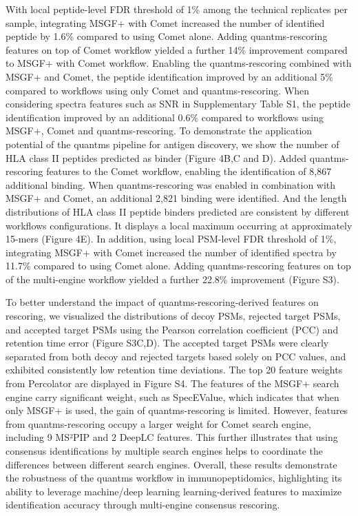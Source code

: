 \documentclass[12pt]{article}
\begin{document}
With local peptide-level FDR threshold of 1\% among the technical replicates per sample, integrating MSGF+ with Comet increased the number of identified peptide by 1.6\% compared to using Comet alone. Adding quantms-rescoring features on top of Comet workflow yielded a further 14\% improvement compared to MSGF+ with Comet workflow. Enabling the quantms-rescoring combined with MSGF+ and Comet, the peptide identification improved by an additional 5\% compared to workflows using only Comet and quantms-rescoring. When considering spectra features such as SNR in Supplementary Table S1, the peptide identification improved by an additional 0.6\% compared to workflows using MSGF+, Comet and quantms-rescoring.
To demonstrate the application potential of the quantms pipeline for antigen discovery, we show the number of HLA class II peptides predicted as binder (Figure 4B,C and D). Added quantms-rescoring features to the Comet workflow, enabling the identification of 8,867 additional binding. When quantms-rescoring was enabled in combination with MSGF+ and Comet, an additional 2,821 binding were identified. And the length distributions of HLA class II peptide binders predicted are consistent by different workflows configurations. It displays a local maximum occurring at approximately 15-mers (Figure 4E). In addition, using local PSM-level FDR threshold of 1\%, integrating MSGF+ with Comet increased the number of identified spectra by 11.7\% compared to using Comet alone. Adding quantms-rescoring features on top of the multi-engine workflow yielded a further 22.8\% improvement (Figure S3).

To better understand the impact of quantms-rescoring-derived features on rescoring, we visualized the distributions of decoy PSMs, rejected target PSMs, and accepted target PSMs using the Pearson correlation coefficient (PCC) and retention time error (Figure S3C,D). The accepted target PSMs were clearly separated from both decoy and rejected targets based solely on PCC values, and exhibited consistently low retention time deviations. The top 20 feature weights from Percolator are displayed in Figure S4. The features of the MSGF+ search engine carry significant weight, such as SpecEValue, which indicates that when only MSGF+ is used, the gain of quantms-rescoring is limited. However, features from quantms-rescoring occupy a larger weight for Comet search engine, including 9 MS²PIP and 2 DeepLC features. This further illustrates that using consensus identifications by multiple search engines helps to coordinate the differences between different search engines. 
Overall, these results demonstrate the robustness of the quantms workflow in immunopeptidomics, highlighting its ability to leverage machine/deep learning learning-derived features to maximize identification accuracy through multi-engine consensus rescoring.
\end{document}
